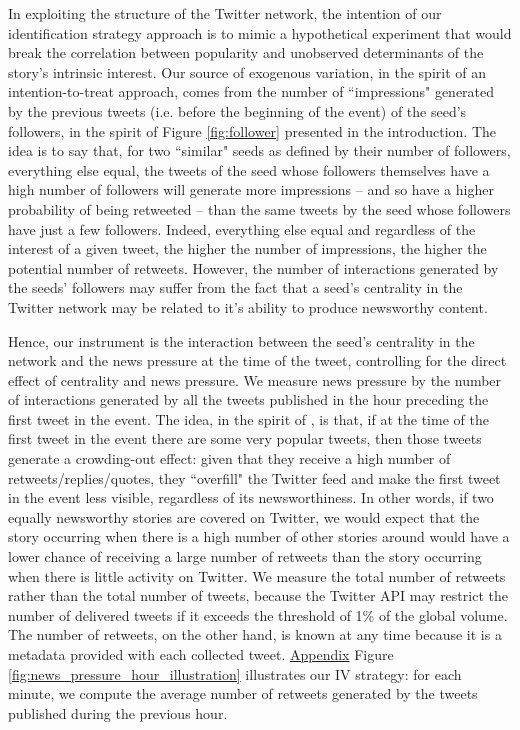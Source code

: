 In exploiting the structure of the Twitter network, the intention of our identification strategy approach is to mimic a hypothetical experiment that would break the correlation between popularity and unobserved determinants of the story's intrinsic interest. Our source of exogenous variation, in the spirit of an intention-to-treat approach, comes from the number of ``impressions" generated by the previous tweets  (i.e. before the beginning of the event) of the seed's followers, in the spirit of Figure \ref{fig:follower} presented in the introduction. The idea is to say that, for two ``similar" seeds as defined by their number of followers, everything else equal, the tweets of the seed whose followers themselves have a high number of followers will generate more impressions -- and so have a higher probability of being retweeted -- than the same tweets by the seed whose followers have just a few followers.  Indeed, everything else equal and regardless of the interest of a given tweet, the higher the number of impressions, the higher the potential number of retweets. However, the number of interactions generated by the seeds' followers may suffer from the fact that a seed's centrality in the Twitter network may be related to it's ability to produce newsworthy content. 

Hence, our instrument is the interaction between the seed's centrality in the network and the news pressure at the time of the tweet, controlling for the direct effect of centrality and news pressure. We measure news pressure by the number of interactions generated by all the tweets published in the hour preceding the first tweet in the event. The idea, in the spirit of \citet{EisenseeStromberg2007}, is that, if at the time of the first tweet in the event there are some very popular tweets, then those tweets generate a crowding-out effect: given that they receive a high number of retweets/replies/quotes, they ``overfill" the Twitter feed and make the first tweet in the event less visible, regardless of its newsworthiness. In other words, if two equally newsworthy stories are covered on Twitter, we would expect that the story occurring when there is a high number of other stories around would have a lower chance of receiving a large number of retweets than the story occurring when there is little activity on Twitter. We measure the total number of retweets rather than the total number of tweets, because the Twitter API may restrict the number of delivered tweets if it exceeds the threshold of 1\% of the global volume. The number of retweets, on the other hand, is known at any time because it is a metadata provided with each collected tweet. \hyperlink{ref:Appendix}{Appendix} Figure \ref{fig:news_pressure_hour_illustration} illustrates our IV strategy: for each minute, we compute the average number of retweets generated by the tweets published during the previous hour.
 
